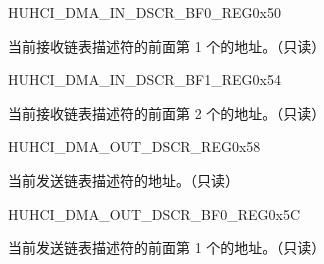 \begin{register}{H}{UHCI\_DMA\_IN\_DSCR\_BF0\_REG}{0x50}\label{regdesc:UHCIDMAINDSCRBF0REG}
%
\regnewline%
\begin{regdesc}\begin{reglist}
\item [UHCI\_DMA\_IN\_DSCR\_BF0\_REG] 当前接收链表描述符的前面第 1 个的地址。（只读）
\end{reglist}\end{regdesc}
\end{register}


\begin{register}{H}{UHCI\_DMA\_IN\_DSCR\_BF1\_REG}{0x54}\label{regdesc:UHCIDMAINDSCRBF1REG}
%
\regnewline%
\begin{regdesc}\begin{reglist}
\item [UHCI\_DMA\_IN\_DSCR\_BF1\_REG] 当前接收链表描述符的前面第 2 个的地址。（只读）
\end{reglist}\end{regdesc}
\end{register}


\begin{register}{H}{UHCI\_DMA\_OUT\_DSCR\_REG}{0x58}\label{regdesc:UHCIDMAOUTDSCRREG}
%
\regnewline%
\begin{regdesc}\begin{reglist}
\item [UHCI\_DMA\_OUT\_DSCR\_REG] 当前发送链表描述符的地址。（只读）
\end{reglist}\end{regdesc}
\end{register}


\begin{register}{H}{UHCI\_DMA\_OUT\_DSCR\_BF0\_REG}{0x5C}\label{regdesc:UHCIDMAOUTDSCRBF0REG}
%
\regnewline%
\begin{regdesc}\begin{reglist}
\item [UHCI\_DMA\_OUT\_DSCR\_BF0\_REG] 当前发送链表描述符的前面第 1 个的地址。（只读）
\end{reglist}\end{regdesc}
\end{register}



